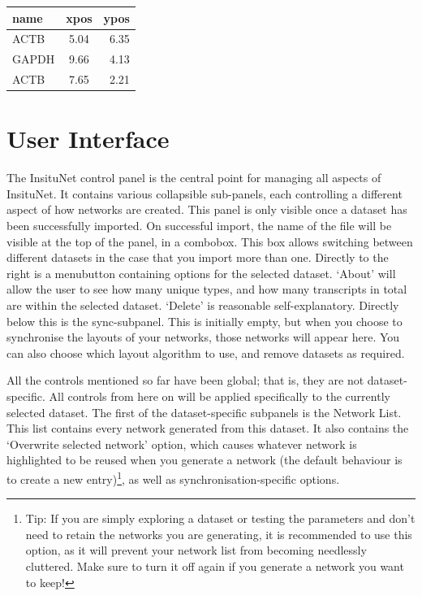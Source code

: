 \documentclass[a4paper,12pt]{article}
\begin{document}
\begin{center}
\begin{tabular}{ l c r }
	\centering
	name & xpos & ypos \\ \hline
	ACTB & 5.04 & 6.35 \\
	GAPDH & 9.66 & 4.13 \\
	ACTB & 7.65 & 2.21 \\
\end{tabular}
\end{center}

\section{User Interface}

The InsituNet control panel is the central point for managing all aspects of InsituNet. It contains various collapsible sub-panels, each controlling a different aspect of how networks are created. This panel is only visible once a dataset has been successfully imported. On successful import, the name of the file will be visible at the top of the panel, in a combobox. This box allows switching between different datasets in the case that you import more than one. Directly to the right is a menubutton containing options for the selected dataset. `About' will allow the user to see how many unique types, and how many transcripts in total are within the selected dataset. `Delete' is reasonable self-explanatory. Directly below this is the sync-subpanel. This is initially empty, but when you choose to synchronise the layouts of your networks, those networks will appear here. You can also choose which layout algorithm to use, and remove datasets as required. 

All the controls mentioned so far have been global; that is, they are not dataset-specific. All controls from here on will be applied specifically to the currently selected dataset. The first of the dataset-specific subpanels is the Network List. This list contains every network generated from this dataset. It also contains the `Overwrite selected network' option, which causes whatever network is highlighted to be reused when you generate a network (the default behaviour is to create a new entry)\footnote{Tip: If you are simply exploring a dataset or testing the parameters and don't need to retain the networks you are generating, it is recommended to use this option, as it will prevent your network list from becoming needlessly cluttered. Make sure to turn it off again if you generate a network you want to keep!}, as well as synchronisation-specific options.
\end{document}
